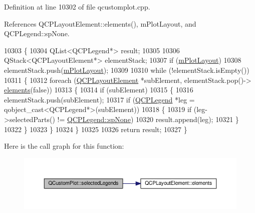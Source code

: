 Definition at line 10302 of file qcustomplot.\+cpp.



References Q\+C\+P\+Layout\+Element\+::elements(), m\+Plot\+Layout, and Q\+C\+P\+Legend\+::sp\+None.


\begin{DoxyCode}
10303 \{
10304   QList<QCPLegend*> result;
10305   
10306   QStack<QCPLayoutElement*> elementStack;
10307   \textcolor{keywordflow}{if} (\hyperlink{class_q_custom_plot_ac97298756882a0eecd98151679850ac1}{mPlotLayout})
10308     elementStack.push(\hyperlink{class_q_custom_plot_ac97298756882a0eecd98151679850ac1}{mPlotLayout});
10309   
10310   \textcolor{keywordflow}{while} (!elementStack.isEmpty())
10311   \{
10312     \textcolor{keywordflow}{foreach} (\hyperlink{class_q_c_p_layout_element}{QCPLayoutElement} *subElement, elementStack.pop()->
      \hyperlink{class_q_c_p_layout_element_a311d60d78e62ef8eaaedb1b6ceb9e788}{elements}(\textcolor{keyword}{false}))
10313     \{
10314       \textcolor{keywordflow}{if} (subElement)
10315       \{
10316         elementStack.push(subElement);
10317         \textcolor{keywordflow}{if} (\hyperlink{class_q_c_p_legend}{QCPLegend} *leg = qobject\_cast<QCPLegend*>(subElement))
10318         \{
10319           \textcolor{keywordflow}{if} (leg->selectedParts() != \hyperlink{class_q_c_p_legend_a5404de8bc1e4a994ca4ae69e2c7072f1a378201c07d500af7126e3ec91652eed7}{QCPLegend::spNone})
10320             result.append(leg);
10321         \}
10322       \}
10323     \}
10324   \}
10325   
10326   \textcolor{keywordflow}{return} result;
10327 \}
\end{DoxyCode}


Here is the call graph for this function\+:\nopagebreak
\begin{figure}[H]
\begin{center}
\leavevmode
\includegraphics[width=350pt]{class_q_custom_plot_a1ea6297300c3e2770e65f95836411755_cgraph}
\end{center}
\end{figure}


\hypertarget{class_q_custom_plot_a6721b8c689bb7f2f400987e580508fe8}{}

